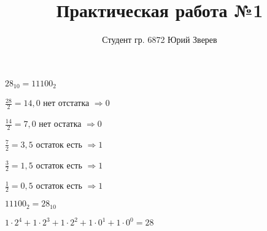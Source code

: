 \documentclass[a4paper,11pt]{article}
\title{Практическая работа №1}
\author{Студент гр. 6872 Юрий Зверев}
\begin{document}
\maketitle

$
28_{10}=11100_2   
$





$\frac{28}{2} = 14,0$ нет отстатка $\Rightarrow 0$






$
\frac{14}{2}= 7,0$ нет остатка $\Rightarrow 0$

 




$
\frac{7}{2}= 3,5$ остаток есть $\Rightarrow 1$






$
\frac{3}{2}= 1,5$ остаток есть $\Rightarrow 1$





$
\frac{1}{2}= 0,5$ остаток есть $\Rightarrow 1$





$
11100_2 = 28_{10}
$




$
1\cdot2^4+1\cdot2^3+1\cdot2^2+1\cdot0^1+1\cdot0^0 = 28
$
\end{document}
